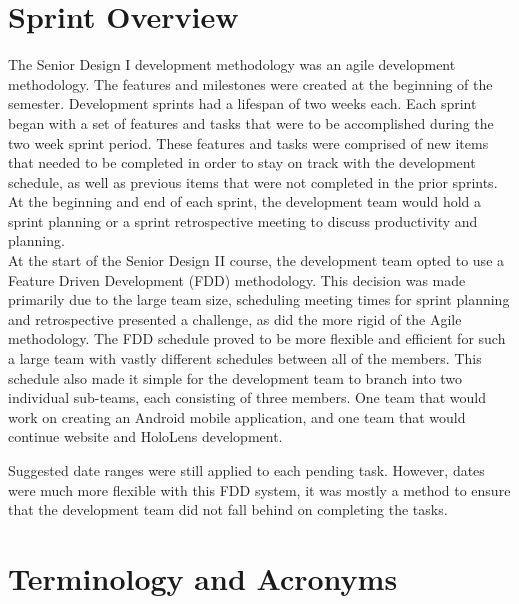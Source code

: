 \section{Sprint  Overview}\label{sec:SprintOverview}
The Senior Design I development methodology was an agile development methodology.
The features and milestones were created at the beginning of the semester.
Development sprints had a lifespan of two weeks each.
Each sprint began with a set of features and tasks that were to be accomplished during the two week sprint period.
These features and tasks were comprised of new items that needed to be completed in order to stay on track with the development schedule, as well as previous items that were not completed in the prior sprints.
At the beginning and end of each sprint, the development team would hold a sprint planning or a sprint retrospective meeting to discuss productivity and planning.\\

At the start of the Senior Design II course, the development team opted to use a Feature Driven Development (FDD) methodology.  
This decision was made primarily due to the large team size, scheduling meeting times for sprint planning and retrospective presented a challenge, as did the more rigid of the Agile methodology. 
The FDD schedule proved to be more flexible and efficient for such a large team with vastly different schedules between all of the members.  
This schedule also made it simple for the development team to branch into two individual sub-teams, each consisting of three members.  
One team that would work on creating an Android mobile application, and one team that would continue website and HoloLens development.

Suggested date ranges were still applied to each pending task. However, dates were much more flexible with this FDD system, it was mostly a method to ensure that the development team did not fall behind on completing the tasks.


\section{Terminology and Acronyms}

